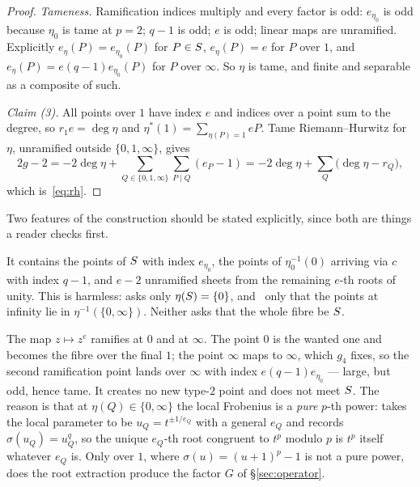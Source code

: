 \begin{proof}
\emph{Tameness.} Ramification indices multiply and every factor is odd:
$e_{\eta_0}$ is odd because $\eta_0$ is tame at $p = 2$; $q-1$ is odd; $e$
is odd; linear maps are unramified. Explicitly $e_\eta(P) = e_{\eta_0}(P)$
for $P \in S$, $e_\eta(P) = e$ for $P$ over $1$, and $e_\eta(P) =
e(q-1)e_{\eta_0}(P)$ for $P$ over $\infty$. So $\eta$ is tame, and finite
and separable as a composite of such.

\emph{Claim (3).} All points over $1$ have index $e$ and indices over a
point sum to the degree, so $r_1e = \deg\eta$ and $\eta^*(1) =
\sum_{\eta(P)=1}eP$. Tame Riemann--Hurwitz for $\eta$, unramified outside
$\{0,1,\infty\}$, gives
\[
  2g-2 = -2\deg\eta + \sum_{Q\in\{0,1,\infty\}}\sum_{P \mid Q}(e_P-1)
       = -2\deg\eta + \sum_Q\bigl(\deg\eta - r_Q\bigr),
\]
which is~\eqref{eq:rh}.
\end{proof}

Two features of the construction should be stated explicitly, since both are
things a reader checks first.

\begin{remark}
\label{rem:mixed-fibre}
It contains the points of $S$ with index $e_{\eta_0}$, the points of
$\eta_0^{-1}(0)$ arriving via $c$ with index $q-1$, and $e-2$ unramified
sheets from the remaining $e$-th roots of unity. This is harmless:
\cite{kramermillerupton2021newton} asks only $\eta(S) = \{0\}$, and~\cite{kramermiller2020abelian} only that the points at infinity lie in
$\eta^{-1}(\{0,\infty\})$. Neither asks that the whole fibre be $S$.
\end{remark}

\begin{remark}
\label{rem:second-branch}
The map $z \mapsto z^e$ ramifies at $0$ and at $\infty$. The point $0$ is
the wanted one and becomes the fibre over the final $1$; the point $\infty$
maps to $\infty$, which $g_4$ fixes, so the second ramification point lands
over $\infty$ with index $e(q-1)e_{\eta_0}$ --- large, but odd, hence tame.
It creates no new type-$2$ point and does not meet $S$. The reason is
that at $\eta(Q) \in \{0,\infty\}$ the local Frobenius is a \emph{pure}
$p$-th power: \cite[\S3.4]{kramermiller2020abelian} takes the local
parameter to be $u_Q = t^{\pm 1/e_Q}$ with a general $e_Q$ and records
$\sigma(u_Q) = u_Q^q$, so the unique $e_Q$-th root congruent to $t^p$ modulo
$p$ is $t^p$ itself whatever $e_Q$ is. Only over $1$, where $\sigma(u) =
(u+1)^p - 1$ is not a pure power, does the root extraction produce the
factor $G$ of \S\ref{sec:operator}.
\end{remark}

